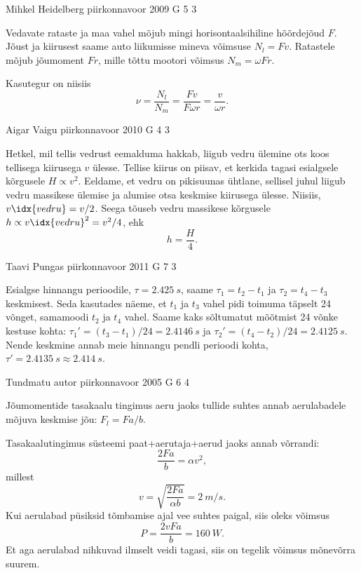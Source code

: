 \documentclass[11pt]{article}
\begin{document}
{%
{Mihkel Heidelberg} %
{piirkonnavoor} %
{2009} %
{G 5} %
{3} %
{

\ifSolution
Vedavate rataste ja maa vahel mõjub mingi horisontaalsihiline hõõrdejõud $F$. Jõust ja kiirusest saame auto liikumisse mineva võimsuse $N_l = Fv$. Ratastele mõjub jõumoment $Fr$, mille tõttu mootori võimsus $N_{m}=\omega F r$.

Kasutegur on niisiis
\[
\nu=\frac{N_{l}}{N_{m}}=\frac{F v}{F \omega r}=\frac{v}{\omega r}.
\]
\fi
}

{Aigar Vaigu} %
{piirkonnavoor} %
{2010} %
{G 4} %
{3} %
{

\ifSolution
Hetkel, mil tellis vedrust eemalduma hakkab, liigub vedru ülemine ots koos tellisega kiirusega $v$ ülesse. Tellise kiirus on piisav, et kerkida tagasi esialgsele kõrgusele $H\propto v^2$. Eeldame, et vedru on pikisuunas ühtlane, sellisel juhul liigub vedru massikese ülemise ja alumise otsa keskmise kiirusega ülesse. Niisiis, $v\idx{vedru}=v/2$. Seega tõuseb vedru massikese kõrgusele $h\propto v\idx{vedru}^2=v^2/4$, ehk
\[h=\frac{H}{4}.\]
\fi
}

{Taavi Pungas} %
{piirkonnavoor} %
{2011} %
{G 7} %
{3} %
{

\ifSolution
Esialgse hinnangu perioodile, $\tau = \SI{2,425}{s}$, saame $\tau_1 = t_2 - t_1$ ja $\tau_2 = t_4 - t_3$
keskmisest. Seda kasutades näeme, et $t_1$ ja $t_3$ vahel pidi toimuma täpselt \num{24} võnget,
samamoodi $t_2$ ja $t_4$ vahel. Saame kaks sõltumatut mõõtmist \num{24} võnke kestuse kohta:
$\tau_1' = (t_3-t_1)/\num{24} = \SI{2,4146}{s}$ ja $\tau_2'= (t_4-t_2)/\num{24} = \SI{2,4125}{s}$. Nende keskmine annab
meie hinnangu pendli perioodi kohta, $\tau' = \SI{2,4135}{s} \approx \SI{2,414}{s}$.
\fi
}

{Tundmatu autor} %
{piirkonnavoor} %
{2005} %
{G 6} %
{4} %
{

\ifSolution
Jõumomentide tasakaalu tingimus aeru jaoks tullide suhtes annab aerulabadele mõjuva keskmise jõu: $F_l = F a/b$.

Tasakaalutingimus süsteemi paat+aerutaja+aerud jaoks annab võrrandi: 
\[
\frac{2Fa}{b} = \alpha v^2 ,
\]
millest
\[
v=\sqrt{\frac{2 F a}{\alpha b}}=\SI{2}{m/s}.
\]
Kui aerulabad püsiksid tõmbamise ajal vee suhtes paigal, siis oleks võimsus
\[
P=\frac{2 v F a}{b}=\SI{160}{W}.
\]
Et aga aerulabad nihkuvad ilmselt veidi tagasi, siis on tegelik võimsus mõnevõrra suurem.
\fi
}

}
\end{document}

